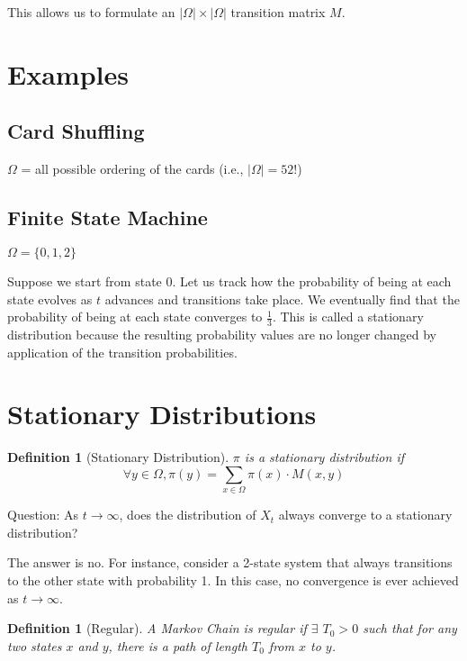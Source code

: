 \documentclass[twoside]{article}
\newtheorem{definition}[theorem]{Definition}
\begin{document}
This allows us to formulate an $|\Omega| \times |\Omega|$ transition matrix $M$.

\section{Examples}

\subsection{Card Shuffling}

$\Omega$ = all possible ordering of the cards (i.e., $|\Omega| = 52!$)

\subsection{Finite State Machine}

$\Omega = \{0, 1, 2\}$

Suppose we start from state 0. Let us track how the probability of being at each state evolves as $t$ advances and transitions take place. We eventually find that the probability of being at each state converges to $\frac{1}{3}$. This is called a stationary distribution because the resulting probability values are no longer changed by application of the transition probabilities.

\section{Stationary Distributions}

\begin{definition}[Stationary Distribution]
   $\pi$ is a stationary distribution if
   $$
   \forall y \in \Omega, \pi(y) = \sum_{x \in \Omega} \pi(x) \cdot M(x, y)
   $$
\end{definition}

Question: As $t \rightarrow \infty$, does the distribution of $X_t$ always converge to a stationary distribution?

The answer is no. For instance, consider a 2-state system that always transitions to the other state with probability 1. In this case, no convergence is ever achieved as $t \rightarrow \infty$.

\begin{definition}[Regular]
   A Markov Chain is regular if $\exists$ $T_0 > 0$ such that for any two states $x$ and $y$, there is a path of length $T_0$ from $x$ to $y$.
\end{definition}
\end{document}
